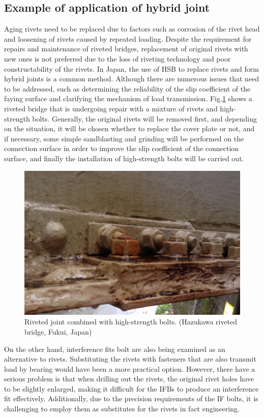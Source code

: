 \subsection{Example of application of hybrid joint}

Aging rivets need to be replaced due to factors such as corrosion of the rivet head and loosening of rivets caused by repeated loading. Despite the requirement for repairs and maintenance of riveted bridges, replacement of original rivets with new ones is not preferred due to the loss of riveting technology and poor constructability of the rivets. In Japan, the use of HSB to replace rivets and form hybrid joints is a common method. Although there are numerous issues that need to be addressed, such as determining the reliability of the slip coefficient of the faying surface and clarifying the mechanism of load transmission. Fig.\ref{fig-bridrivhsb} shows a riveted bridge that is undergoing repair with a mixture of rivets and high-strength bolts. Generally, the original rivets will be removed first, and depending on the situation, it will be chosen whether to replace the cover plate or not, and if necessary, some simple sandblasting and grinding will be performed on the connection surface in order to improve the slip coefficient of the connection surface, and finally the installation of high-strength bolts will be carried out.

%
\begin{figure}[ht]
    \centering
    \includegraphics[width=0.75\linewidth]{imgs//ch2/bridge-rivet-HSB.jpg}
    \caption{Riveted joint combined with high-strength bolts. (Hazukawa riveted bridge, Fukui, Japan)}
    \label{fig-bridrivhsb}
\end{figure}

On the other hand, interference fits bolt are also being examined as an alternative to rivets. Substituting the rivets with fasteners that are also transmit load by bearing would have been a more practical option. However, there have a serious problem is that when drilling out the rivets, the original rivet holes have to be slightly enlarged, making it difficult for the IFBs to produce an interference fit effectively. Additionally, due to the precision requirements of the IF bolts, it is challenging to employ them as substitutes for the rivets in fact engineering.

